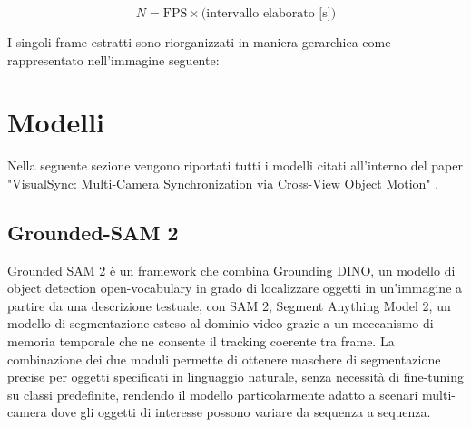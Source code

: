 $$N = \text{FPS} \times \text{(intervallo elaborato [s])}$$

I singoli frame estratti sono riorganizzati in maniera gerarchica come rappresentato nell'immagine seguente:


\section{Modelli}
Nella seguente sezione vengono riportati tutti i modelli citati all'interno del paper "VisualSync: Multi-Camera Synchronization via Cross-View Object Motion" \cite{visualsync}.

\subsection{Grounded-SAM 2}
Grounded SAM 2 è un framework che combina Grounding DINO, un modello di object detection open-vocabulary in grado di localizzare oggetti in un'immagine a partire da una descrizione testuale, con SAM 2, Segment Anything Model 2, un modello di segmentazione esteso al dominio video grazie a un meccanismo di memoria temporale che ne consente il tracking coerente tra frame. La combinazione dei due moduli permette di ottenere maschere di segmentazione precise per oggetti specificati in linguaggio naturale, senza necessità di fine-tuning su classi predefinite, rendendo il modello particolarmente adatto a scenari multi-camera dove gli oggetti di interesse possono variare da sequenza a sequenza.
